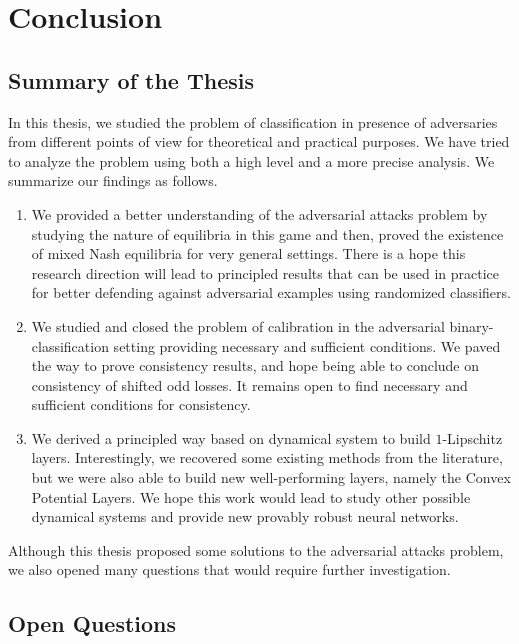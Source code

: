\chapter{Conclusion}
\minitoc
\section{Summary of the Thesis}

In this thesis, we studied the problem of  classification in presence of adversaries from different points of view for theoretical and practical purposes. We have tried to analyze the problem using both a high level
and a more precise analysis. We summarize our findings as follows.
\begin{tcolorbox}[colback=grund,colframe=rahmen,title=Summary of contributions]
\begin{enumerate}
    \item We provided a better understanding of the adversarial attacks problem by studying the nature of equilibria in this game and then, proved the existence of mixed Nash equilibria for very general settings. There is a hope this research direction will lead to principled results that can be used in practice for better defending against adversarial examples using randomized classifiers.
    \item We studied and closed the problem of calibration in the adversarial binary-classification setting providing necessary and sufficient conditions. We paved the way to prove consistency results, and hope being able to conclude on consistency of shifted odd losses. It remains open to find necessary and sufficient conditions for consistency.
    \item We derived a principled way based on dynamical system to build $1$-Lipschitz layers. Interestingly, we recovered some existing methods from the literature, but we were also able to build new well-performing layers, namely the Convex Potential Layers. We hope this work would lead to study other possible dynamical systems and provide new provably robust neural networks.
\end{enumerate}
\end{tcolorbox}
Although this thesis proposed some solutions to the adversarial attacks problem, we also opened many questions that would require further investigation. 
\section{Open Questions}



